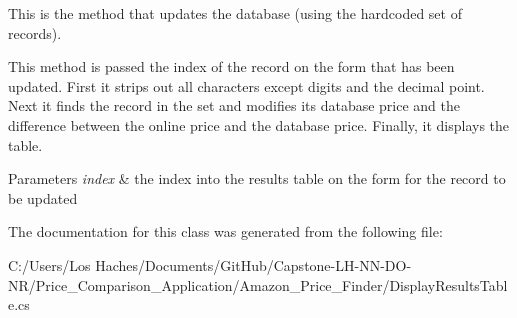 This is the method that updates the database (using the hardcoded set of records). 

This method is passed the index of the record on the form that has been updated. First it strips out all characters except digits and the decimal point. Next it finds the record in the set and modifies its database price and the difference between the online price and the database price. Finally, it displays the table. 
\begin{DoxyParams}{Parameters}
{\em index} & the index into the results table on the form for the record to be updated \\
\hline
\end{DoxyParams}


The documentation for this class was generated from the following file\-:\begin{DoxyCompactItemize}
\item 
C\-:/\-Users/\-Los Haches/\-Documents/\-Git\-Hub/\-Capstone-\/\-L\-H-\/\-N\-N-\/\-D\-O-\/\-N\-R/\-Price\-\_\-\-Comparison\-\_\-\-Application/\-Amazon\-\_\-\-Price\-\_\-\-Finder/Display\-Results\-Table.\-cs\end{DoxyCompactItemize}
